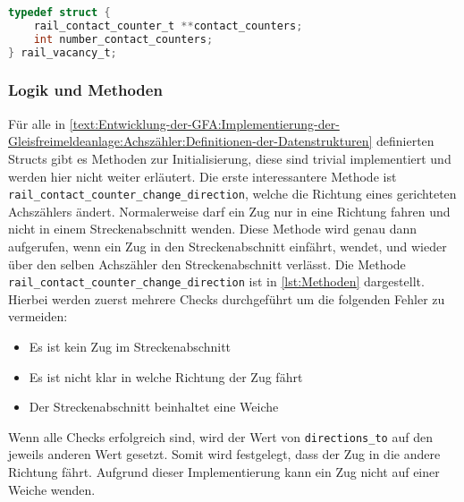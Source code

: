 \begin{margin}
    \begin{lstlisting}[caption={Definition des Structs rail\_vacancy\_t},label={lst:Structs3},language=C]
typedef struct {
    rail_contact_counter_t **contact_counters;
    int number_contact_counters;
} rail_vacancy_t;
    \end{lstlisting}
\end{margin}

\subsubsection{Logik und Methoden}\label{text:Entwicklung-der-GFA:Implementierung-der-Gleisfreimeldeanlage:Achszähler:Logik-und-Methoden-der-Achszähler}

Für alle in \autoref{text:Entwicklung-der-GFA:Implementierung-der-Gleisfreimeldeanlage:Achszähler:Definitionen-der-Datenstrukturen}  definierten Structs gibt es Methoden zur Initialisierung, diese sind trivial implementiert und werden hier nicht weiter erläutert. Die erste interessantere Methode ist \texttt{rail\_contact\_counter\_change\_direction}, welche die Richtung eines gerichteten Achszählers ändert. Normalerweise darf ein Zug nur in eine Richtung fahren und nicht in einem Streckenabschnitt wenden. Diese Methode wird genau dann aufgerufen, wenn ein Zug in den Streckenabschnitt einfährt, wendet, und wieder über den selben Achszähler den Streckenabschnitt verlässt. Die Methode \texttt{rail\_contact\_counter\_change\_direction} ist in \autoref{lst:Methoden} dargestellt. Hierbei werden zuerst mehrere Checks durchgeführt um die folgenden Fehler zu vermeiden:
\begin{itemize}
    \item Es ist kein Zug im Streckenabschnitt
    \item Es ist nicht klar in welche Richtung der Zug fährt
    \item Der Streckenabschnitt beinhaltet eine Weiche
\end{itemize}
Wenn alle Checks erfolgreich sind, wird der Wert von \texttt{directions\_to} auf den jeweils anderen Wert gesetzt. Somit wird festgelegt, dass der Zug in die andere Richtung fährt. Aufgrund dieser Implementierung kann ein Zug nicht auf einer Weiche wenden.

